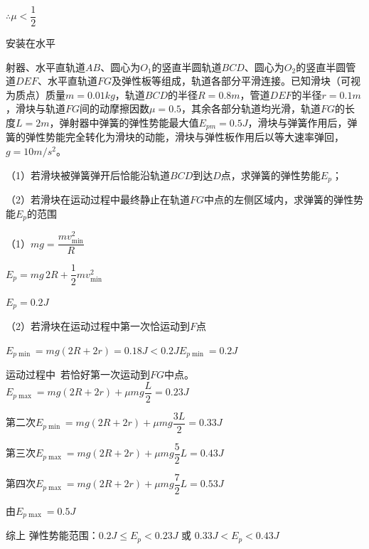 $\therefore \mu<\dfrac{1}{2}$
\begin{problem}
安装在水平%

射器、水平直轨道$AB$、圆心为$O_1$的竖直半圆轨道$BCD$、圆心为$O_2$的竖直半圆管道$DEF$、水平直轨道$FG$及弹性板等组成，轨道各部分平滑连接。已知滑块（可视为质点）质量$m=0.01\unit{kg}$，轨道$BCD$的半径$R=0.8\unit{m}$，管道$DEF$的半径$r=0.1\unit{m}$，滑块与轨道$FG$间的动摩擦因数$\mu=0.5$，其余各部分轨道均光滑，轨道$FG$的长度$L=2\unit{m}$，弹射器中弹簧的弹性势能最大值$E_{pm}=0.5\unit{J}$，滑块与弹簧作用后，弹簧的弹性势能完全转化为滑块的动能，滑块与弹性板作用后以等大速率弹回，$g=10\unit{m/s^2}$。

（1）若滑块被弹簧弹开后恰能沿轨道$BCD$到达$D$点，求弹簧的弹性势能$E_p$；

（2）若滑块在运动过程中最终静止在轨道$FG$中点的左侧区域内，求弹簧的弹性势能$E_p$的范围
\begin{solution}
（1）$mg=\dfrac{mv_{\min}^2}{R}$

$E_p=mg\,2R+\dfrac{1}{2}mv_{\min}^2$

$E_p=0.2\unit{J}$

（2）若滑块在运动过程中第一次恰运动到$F$点

$E_{p\min}=mg(2R+2r)=0.18\unit{J}<0.2\unit{J}$\qquad $E_{p\min}=0.2\unit{J}$

运动过程中\ 若恰好第一次运动到$FG$中点。\ $E_{p\max}=mg(2R+2r)+\mu mg\dfrac{L}{2}=0.23\unit{J}$%

第二次\quad $E_{p\min}=mg(2R+2r)+\mu mg\dfrac{3L}{2}=0.33\unit{J}$

第三次\quad $E_{p\max}=mg(2R+2r)+\mu mg\dfrac{5}{2}L=0.43\unit{J}$

第四次\quad $E_{p\max}=mg(2R+2r)+\mu mg\dfrac{7}{2}L=0.53\unit{J}$

由$E_{p\max}=0.5\unit{J}$

综上 弹性势能范围：$0.2\unit{J}\le E_p<0.23\unit{J}$ 或 $0.33\unit{J}<E_p<0.43\unit{J}$
\end{solution}
\end{problem}
